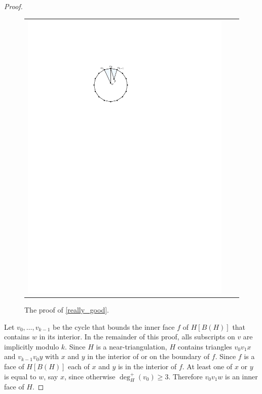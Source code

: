 \documentclass{article}
\newcommand{\pat}[1]{\textcolor{red}{PM: #1}}
\newcommand{\hussein}[1]{\textcolor{purple}{HH: #1}}
\theoremstyle{definition}
\begin{document}
\begin{proof}
\begin{figure}
\begin{tabular}{ccc}
      \includegraphics[page=3]{figs/really_good}
    \end{tabular}
    \caption{The proof of \cref{really_good}.
    }
    \label{really_good_fig}
  \end{figure}

  Let $v_0,\ldots,v_{k-1}$ be the cycle that bounds the inner face $f$ of $H[B(H)]$ that contains $w$ in its interior. In the remainder of this proof, alls subscripts on $v$ are implicitly modulo $k$.  Since $H$ is a near-triangulation, $H$ contains triangles $v_0v_1x$ and $v_{k-1}v_0 y$ with $x$ and $y$ in the interior of or on the boundary of $f$.  Since $f$ is a face of $H[B(H)]$ each of $x$ and $y$ is in the interior of $f$.  At least one of $x$ or $y$ is equal to $w$, say $x$, since otherwise $\deg^+_H(v_0)\ge 3$.  Therefore $v_0v_1 w$ is an inner face of $H$.


\end{proof}
\end{document}
